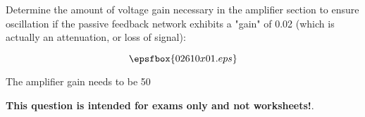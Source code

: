 

Determine the amount of voltage gain necessary in the amplifier section to ensure oscillation if the passive feedback network exhibits a "gain" of 0.02 (which is actually an attenuation, or loss of signal):

$$\epsfbox{02610x01.eps}$$







The amplifier gain needs to be 50







{\bf This question is intended for exams only and not worksheets!}.




